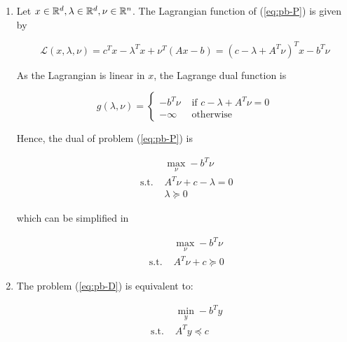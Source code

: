 \documentclass[a4paper, 11pt]{report}
\begin{document}
\begin{enumerate}
    \item Let $x \in \mathbb{R}^{d}, \lambda \in \mathbb{R}^{d}, \nu \in \mathbb{R}^{n}$. The Lagrangian function of (\ref{eq:pb-P}) is given by
    
    \[ \mathcal{L} \left( x, \lambda, \nu \right) = c^{T} x - \lambda^{T} x + \nu^{T} \left( Ax - b \right) = \left( c - \lambda + A^{T} \nu \right)^{T} x - b^{T} \nu \]
    
    As the Lagrangian is linear in $x$, the Lagrange dual function is
    
    \begin{equation*}
        g \left( \lambda, \nu \right) = \begin{cases}
        - b^{T} \nu & \text{ if } c - \lambda + A^{T} \nu = 0 \\
        - \infty & \text{ otherwise }
        \end{cases}
    \end{equation*}
    
    \pagebreak
    
    Hence, the dual of problem (\ref{eq:pb-P}) is

    \begin{equation*}
        \begin{aligned}
        & \max_{\nu} 
        - b^{T} \nu \\
        \text{ s.t. }
        & A^{T} \nu + c - \lambda = 0 \\
        & \lambda \succeq 0
        \end{aligned}
    \end{equation*}
    
    which can be simplified in
    
    \begin{equation*}
        \boxed{\begin{aligned}
        & \max_{\nu} 
        - b^{T} \nu \\
        \text{ s.t. }
        & A^{T} \nu + c \succeq 0
        \end{aligned}}
    \end{equation*}

    \item The problem (\ref{eq:pb-D}) is equivalent to:
    
    \begin{equation*}
        \begin{aligned}
        & \min_{y}
        - b^{T} y \\
        \text{ s.t. }
        & A^{T} y \preceq c
        \end{aligned}
    \end{equation*}
    

\end{enumerate}
\end{document}
